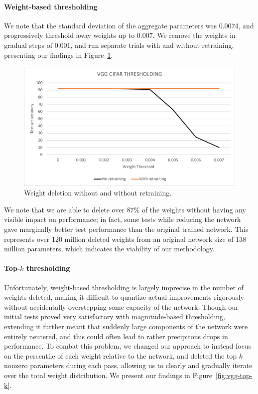 \documentclass[10pt,twocolumn,letterpaper]{article}
\begin{document}
\paragraph{Weight-based thresholding}
We note that the standard deviation of the aggregate parameters was 0.0074, and progressively threshold away weights up to 0.007.
We remove the weights in gradual steps of 0.001, and run separate trials with and without retraining, presenting our findings in Figure~\ref{fig:vgg-thresh}.
\begin{figure}[h]
  \centering
  \includegraphics[width=\linewidth]{cifar-threshold.pdf}
  \caption{Weight deletion without and without retraining.}
  \label{fig:vgg-thresh}
\end{figure}

We note that we are able to delete over 87\% of the weights without having any visible impact on performance; in fact, some tests while reducing the network gave marginally better test performance than the original trained network.
This represents over 120 million deleted weights from an original network size of 138 million parameters, which indicates the viability of our methodology.

\paragraph{Top-$k$ thresholding}
Unfortunately, weight-based thresholding is largely imprecise in the number of weights deleted, making it difficult to quantize actual improvements rigorously without accidentally overstepping some capacity of the network.
Though our initial tests proved very satisfactory with magnitude-based thresholding, extending it further meant that suddenly large components of the network were entirely neutered, and this could often lead to rather precipitous drops in performance.
To combat this problem, we changed our approach to instead focus on the percentile of each weight relative to the network, and deleted the top $k$ nonzero parameters during each pass, allowing us to clearly and gradually iterate over the total weight distribution.
We present our findings in Figure~\ref{fig:vgg-top-k}.
\end{document}
